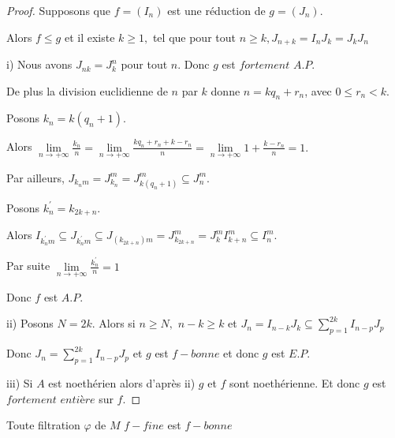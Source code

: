 \begin{proof}
	Supposons que $f=(I_{n})$ est une réduction de $g=(J_{n}).$
	
	Alors $f\leq g$ et il existe $k\geq 1,$ tel que pour tout $n\geq k,J_{n+k}=I_{n}J_{k}=J_{k}J_{n}$
	
	i) Nous avons $J_{nk}=J_{k}^{n}$ pour tout $n.$ Donc $g$ est $fortement$ $A.P.$
	
	De plus la division euclidienne de $n$ par $k$ donne $n=kq_{n}+r_{n}$, avec $0\leq r_{n}<k.$
	
	Posons $k_{n}=k(q_{n}+1).$
	
	Alors $\underset{n\longrightarrow +\infty }{\lim }\frac{k_{n}}{n}=\underset{n\longrightarrow +\infty }{\lim }\frac{kq_{n}+r_{n}+k-r_{n}}{n}=\underset{n\longrightarrow +\infty }{\lim }1+\frac{k-r_{n}}{n}=1.$
	
	Par ailleurs, $J_{k_{n}m}=J_{k_{n}}^{m}=J_{k(q_{n}+1)}^{m}\subseteq J_{n}^{m}.$
	
	Posons $k_{n}^{\prime }=k_{2k+n}.$
	
	Alors $I_{k_{n}^{\prime }m}\subseteq J_{k_{n}^{\prime }m}\subseteq
	J_{(k_{2k+n})m}=J_{k_{2k+n}}^{m}=J_{k}^{m}I_{k+n}^{m}\subseteq I_{n}^{m}.$
	
	Par suite $\underset{n\longrightarrow +\infty }{\lim }\frac{k_{n}^{\prime }}{n}=1$
	
	Donc $f$ est $A.P.$
	
	
	ii) Posons $N=2k.$ Alors si $n\geq N,$ $n-k\geq k$ et $J_{n}=I_{n-k}J_{k}\subseteq \sum\limits_{p=1}^{2k}I_{n-p}J_{p}$
	
	Donc $J_{n}=\sum\limits_{p=1}^{2k}I_{n-p}J_{p}$ et $g$ est $f-bonne$ et donc $g$ est $E.P.$
	
	iii) Si $A$ est noethérien alors d'après ii) $g$ et $f$ sont noethérienne. Et donc $g$ est $fortement$ $entière$ sur $f.$
	
\end{proof}
\begin{maproposition}
	Toute filtration $\varphi$ de $M$ $f-fine$ est $f-bonne$
\end{maproposition}
